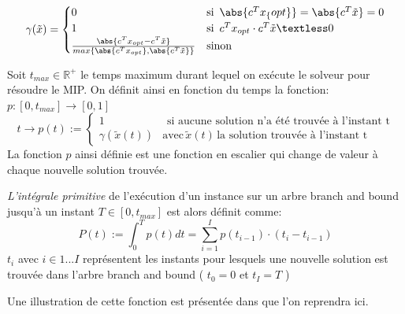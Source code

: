 \documentclass[12pt,a4paper,oneside]{book}
\theoremstyle{definition}
\newcommand{\R}{\mathbb{R}}
\begin{document}
	\[
		\gamma(\tilde{x}) = \begin{cases}
			0 & \text{si} \hspace{5pt} \abs{c^T x_\{opt\}} = \abs{c^T \tilde{x}} = 0 \\
			1 & \text{si} \hspace{5pt}  c^T x_{opt} \cdot c^T \tilde{x} \textless 0 \\
			\frac{\abs{c^T x_{opt} - c^T \tilde{x} } }{max\{\abs{c^T x_{opt}}, \abs{c^T \tilde{x}} \} } & \text{sinon}
		\end{cases}
	\]

	Soit $t_{max} \in \R^+$ le temps maximum durant lequel on exécute le solveur pour résoudre le MIP. On définit ainsi en fonction du temps la fonction:\\
	$p: [0, t_{max}] \rightarrow [0, 1]$
	\[
		t \rightarrow p(t) := \begin{cases}
						 1 & \hspace{5pt} \text{si aucune solution n'a été trouvée à l'instant t} \\
						 \gamma(\tilde{x}(t)) & \text{avec} \hspace{2pt} \tilde{x}(t) \hspace{2pt} \text{la solution trouvée à l'instant t}
			     	   \end{cases} 
	\] 
	La fonction $p$ ainsi définie est une fonction en escalier qui change de valeur à chaque nouvelle solution trouvée. 
	
	\textit{L'intégrale primitive} de l'exécution d'un instance sur un arbre branch and bound jusqu'à un instant $T \in [0,t_{max}] $ est alors définit comme:
	\[
		P(t) := \int_{0}^{T}p(t) dt = \sum_{i=1}^{I} p(t_{i-1}) \cdot (t_i - t_{i-1})
	\]
	$t_i$ avec $i \in {1...I}$ représentent les instants pour lesquels une nouvelle solution est trouvée dans l'arbre branch and bound ( $t_0 = 0 $ et $ t_I = T $ )
	
	Une illustration de cette fonction est présentée dans \cite{Khalil2017} que l'on reprendra ici.
	
\end{document}
